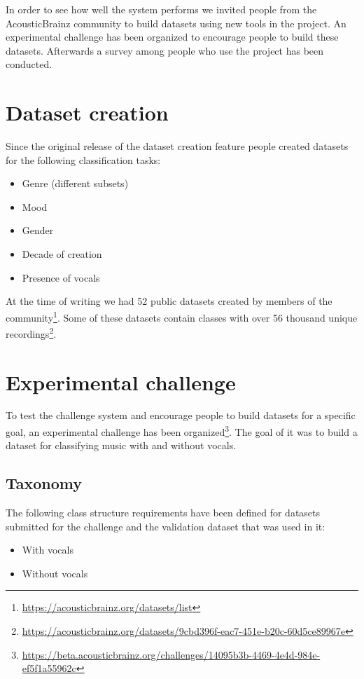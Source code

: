 In order to see how well the system performs we invited people from the AcousticBrainz community to build datasets using new tools in the project. An experimental challenge has been organized to encourage people to build these datasets. Afterwards a survey among people who use the project has been conducted.


\section{Dataset creation}

Since the original release of the dataset creation feature people created datasets for the following classification tasks:
\begin{itemize}
    \item Genre (different subsets)
    \item Mood
    \item Gender
    \item Decade of creation
    \item Presence of vocals
\end{itemize}

At the time of writing we had 52 public datasets created by members of the community\footnote{\url{https://acousticbrainz.org/datasets/list}}. Some of these datasets contain classes with over 56 thousand unique recordings\footnote{\url{https://acousticbrainz.org/datasets/9cbd396f-eac7-451e-b20c-60d5ce89967e}}.


\section{Experimental challenge}

To test the challenge system and encourage people to build datasets for a specific goal, an experimental challenge has been organized\footnote{\url{https://beta.acousticbrainz.org/challenges/14095b3b-4469-4e4d-984e-ef5f1a55962c}}. The goal of it was to build a dataset for classifying music with and without vocals.

\subsection{Taxonomy}

The following class structure requirements have been defined for datasets submitted for the challenge and the validation dataset that was used in it:
\begin{itemize}
    \item With vocals
    \item Without vocals
\end{itemize}

